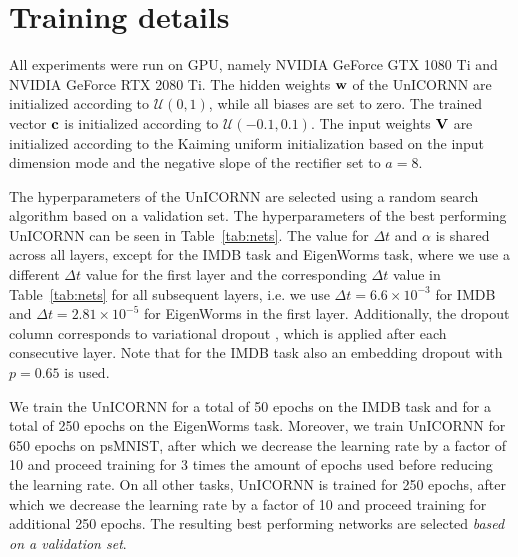 \documentclass{article}
\newcommand{\bw}{{\bf w}}
\newcommand{\bV}{{\bf V}}
\newcommand{\bc}{{\bf c}}
\newcommand{\Dt}{{\Delta t}}
\newcommand{\Tref}[1]{Table~\ref{#1}}
\begin{document}
\onecolumn
{}
\appendix

\setcounter{equation}{0}
\section{Training details}
All experiments were run on GPU, namely NVIDIA GeForce GTX 1080 Ti and NVIDIA GeForce RTX 2080 Ti. The hidden weights $\bw$ of the UnICORNN are initialized according to  $\mathcal{U}(0,1)$, while all biases are set to zero. The trained vector $\bc$ is initialized according to $\mathcal{U}(-0.1,0.1)$. The input weights $\bV$ are initialized according to the Kaiming uniform initialization \citep{kaiming} based on the input dimension mode and the negative slope of the rectifier set to $a=8$.

The hyperparameters of the UnICORNN are selected using a random search algorithm based on a validation set. The hyperparameters of the best performing UnICORNN can be seen in \Tref{tab:nets}. The value for $\Dt$ and $\alpha$ is shared across all layers, except for the IMDB task and EigenWorms task, where we use a different $\Dt$ value for the first layer and the corresponding $\Dt$ value in \Tref{tab:nets} for all subsequent layers, i.e. we use $\Dt=6.6\times 10^{-3}$ for IMDB and $\Dt=2.81\times10^{-5}$ for EigenWorms in the first layer. 
Additionally, the dropout column corresponds to variational dropout \citep{gal}, which is applied after each consecutive layer. Note that for the IMDB task also an embedding dropout with $p=0.65$ is used.

We train the UnICORNN for a total of 50 epochs on the IMDB task and for a total of 250 epochs on the EigenWorms task. Moreover, we train UnICORNN for 650 epochs on psMNIST, after which we decrease the learning rate by a factor of 10 and proceed training for 3 times the amount of epochs used before reducing the learning rate. On all other tasks, UnICORNN is trained for 250 epochs, after which we decrease the learning rate by a factor of 10 and proceed training for additional 250 epochs.
The resulting best performing networks are selected \emph{based on a validation set}.
\end{document}
